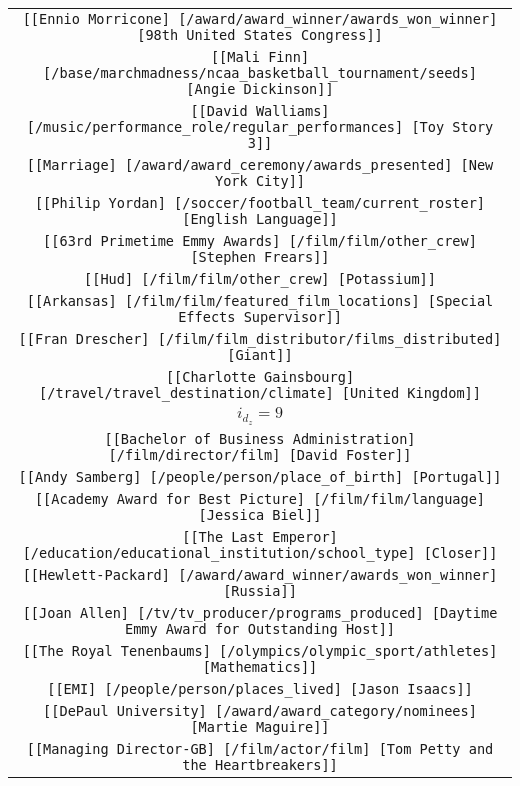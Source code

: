 \begin{longtable}{|c|}
    \texttt{[[Ennio Morricone] [/award/award\_winner/awards\_won\_winner] [98th United States Congress]]}\\
    \texttt{[[Mali Finn] [/base/marchmadness/ncaa\_basketball\_tournament/seeds] [Angie Dickinson]]}\\
    \texttt{[[David Walliams] [/music/performance\_role/regular\_performances] [Toy Story 3]]}\\
    \texttt{[[Marriage] [/award/award\_ceremony/awards\_presented] [New York City]]}\\
    \texttt{[[Philip Yordan] [/soccer/football\_team/current\_roster] [English Language]]}\\
    \texttt{[[63rd Primetime Emmy Awards] [/film/film/other\_crew] [Stephen Frears]]}\\
    \texttt{[[Hud] [/film/film/other\_crew] [Potassium]]}\\
    \texttt{[[Arkansas] [/film/film/featured\_film\_locations] [Special Effects Supervisor]]}\\
    \texttt{[[Fran Drescher] [/film/film\_distributor/films\_distributed] [Giant]]}\\
    \texttt{[[Charlotte Gainsbourg] [/travel/travel\_destination/climate] [United Kingdom]]}\\
    \hline
    \rowcolor[HTML]{EFEFEF} 
    \textsc{$i_{d_z}=9$}\\ \hline
    \texttt{[[Bachelor of Business Administration] [/film/director/film] [David Foster]]}\\
    \texttt{[[Andy Samberg] [/people/person/place\_of\_birth] [Portugal]]}\\
    \texttt{[[Academy Award for Best Picture] [/film/film/language] [Jessica Biel]]}\\
    \texttt{[[The Last Emperor] [/education/educational\_institution/school\_type] [Closer]]}\\
    \texttt{[[Hewlett-Packard] [/award/award\_winner/awards\_won\_winner] [Russia]]}\\
    \texttt{[[Joan Allen] [/tv/tv\_producer/programs\_produced] [Daytime Emmy Award for Outstanding Host]]}\\
    \texttt{[[The Royal Tenenbaums] [/olympics/olympic\_sport/athletes] [Mathematics]]}\\
    \texttt{[[EMI] [/people/person/places\_lived] [Jason Isaacs]]}\\
    \texttt{[[DePaul University] [/award/award\_category/nominees] [Martie Maguire]]}\\
    \texttt{[[Managing Director-GB] [/film/actor/film] [Tom Petty and the Heartbreakers]]}\\

\end{longtable}
